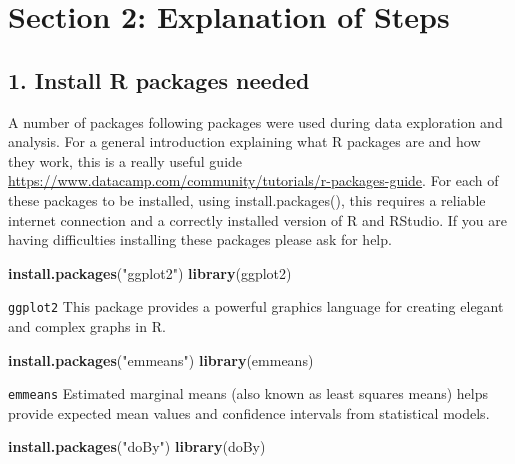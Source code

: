 \documentclass[]{book}
\newenvironment{Shaded}{\begin{snugshade}}{\end{snugshade}}
\newcommand{\KeywordTok}[1]{\textcolor[rgb]{0.13,0.29,0.53}{\textbf{#1}}}
\newcommand{\StringTok}[1]{\textcolor[rgb]{0.31,0.60,0.02}{#1}}
\newcommand{\NormalTok}[1]{#1}
\theoremstyle{definition}
\theoremstyle{definition}
\theoremstyle{definition}
\theoremstyle{remark}
\begin{document}
\section{Section 2: Explanation of
Steps}\label{section-2-explanation-of-steps-4}

\subsection{1. Install R packages
needed}\label{install-r-packages-needed-4}

A number of packages following packages were used during data
exploration and analysis. For a general introduction explaining what R
packages are and how they work, this is a really useful guide
\url{https://www.datacamp.com/community/tutorials/r-packages-guide}. For
each of these packages to be installed, using install.packages(), this
requires a reliable internet connection and a correctly installed
version of R and RStudio. If you are having difficulties installing
these packages please ask for help.

\begin{Shaded}
\begin{Highlighting}[]
\KeywordTok{install.packages}\NormalTok{(}\StringTok{"ggplot2"}\NormalTok{)}
\KeywordTok{library}\NormalTok{(ggplot2)}
\end{Highlighting}
\end{Shaded}

\texttt{ggplot2} This package provides a powerful graphics language for
creating elegant and complex graphs in R.

\begin{Shaded}
\begin{Highlighting}[]
\KeywordTok{install.packages}\NormalTok{(}\StringTok{"emmeans"}\NormalTok{)}
\KeywordTok{library}\NormalTok{(emmeans)}
\end{Highlighting}
\end{Shaded}

\texttt{emmeans} Estimated marginal means (also known as least squares
means) helps provide expected mean values and confidence intervals from
statistical models.

\begin{Shaded}
\begin{Highlighting}[]
\KeywordTok{install.packages}\NormalTok{(}\StringTok{"doBy"}\NormalTok{)}
\KeywordTok{library}\NormalTok{(doBy)}
\end{Highlighting}
\end{Shaded}
\end{document}
